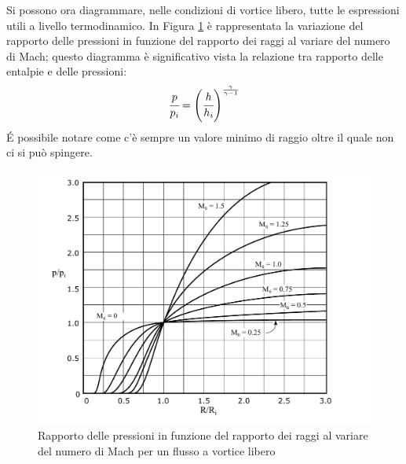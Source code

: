 Si possono ora diagrammare, nelle condizioni di vortice libero, tutte le espressioni utili a livello termodinamico. In Figura \ref{fig:VorticeLibero} è rappresentata la variazione del rapporto delle pressioni in funzione del rapporto dei raggi al variare del numero di Mach; questo diagramma è significativo vista la relazione tra rapporto delle entalpie e delle pressioni:
\begin{align*}
	\cfrac{p}{p_i} = \left( \cfrac{h}{h_i} \right)^{\frac{\gamma}{\gamma - 1}}
\end{align*}
\'E possibile notare come c'è sempre un valore minimo di raggio oltre il quale non ci si può spingere.
\begin{figure}
\centering
  \includegraphics[width=.75\textwidth]{fig/VorticeLibero.pdf}
\caption{Rapporto delle pressioni in funzione del rapporto dei raggi al variare del numero di Mach per un flusso a vortice libero}
\label{fig:VorticeLibero}
\end{figure}
